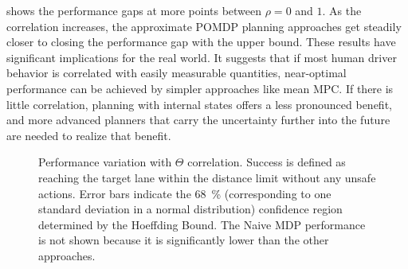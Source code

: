  shows the performance gaps at more points between $\rho=0$ and $1$.
As the correlation increases, the approximate POMDP planning approaches get steadily closer to closing the performance gap with the upper bound.
These results have significant implications for the real world.
It suggests that if most human driver behavior is correlated with easily measurable quantities, near-optimal performance can be achieved by simpler approaches like mean MPC.
If there is little correlation, planning with internal states offers a less pronounced benefit, and more advanced planners that carry the uncertainty further into the future are needed to realize that benefit.

\begin{figure}[htbp]
    \centering
    
    \caption[Performance variation with $\Theta$ correlation]{Performance variation with $\Theta$ correlation. Success is defined as reaching the target lane within the distance limit without any unsafe actions. Error bars indicate the \SI{68}{\percent} (corresponding to one standard deviation in a normal distribution) confidence region determined by the Hoeffding Bound. The Naive MDP performance is not shown because it is significantly lower than the other approaches.}
    \label{fig:corplot}
\end{figure}

